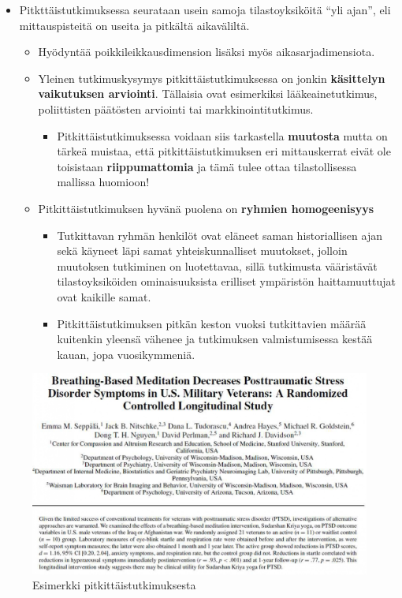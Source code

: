 \documentclass[
]{book}
\providecommand{\tightlist}{%
  \setlength{\itemsep}{0pt}\setlength{\parskip}{0pt}}
\begin{document}
\begin{itemize}
\tightlist
\item
  Pitkttäistutkimuksessa seurataan usein samoja tilastoyksiköitä ``yli ajan'', eli mittauspisteitä on useita ja pitkältä aikaväliltä.

  \begin{itemize}
  \tightlist
  \item
    Hyödyntää poikkileikkausdimension lisäksi myös aikasarjadimensiota.
  \item
    Yleinen tutkimuskysymys pitkittäistutkimuksessa on jonkin \textbf{käsittelyn vaikutuksen arviointi}. Tällaisia ovat esimerkiksi lääkeainetutkimus, poliittisten päätösten arviointi tai markkinointitutkimus.

    \begin{itemize}
    \tightlist
    \item
      Pitkittäistutkimuksessa voidaan siis tarkastella \textbf{muutosta} mutta on tärkeä muistaa, että pitkittäistutkimuksen eri mittauskerrat eivät ole toisistaan \textbf{riippumattomia} ja tämä tulee ottaa tilastollisessa mallissa huomioon!
    \end{itemize}
  \item
    Pitkittäistutkimuksen hyvänä puolena on \textbf{ryhmien homogeenisyys}

    \begin{itemize}
    \tightlist
    \item
      Tutkittavan ryhmän henkilöt ovat eläneet saman historiallisen ajan sekä käyneet läpi samat yhteiskunnalliset muutokset, jolloin muutoksen tutkiminen on luotettavaa, sillä tutkimusta vääristävät tilastoyksiköiden ominaisuuksista erilliset ympäristön haittamuuttujat ovat kaikille samat.
    \item
      Pitkittäistutkimuksen pitkän keston vuoksi tutkittavien määrää kuitenkin yleensä vähenee ja tutkimuksen valmistumisessa kestää kauan, jopa vuosikymmeniä.
    \end{itemize}
  \end{itemize}
\end{itemize}

\begin{figure}

{\centering \includegraphics[width=1\linewidth]{images/long} 

}

\caption{Esimerkki pitkittäistutkimuksesta}\label{fig:long}
\end{figure}
\end{document}
